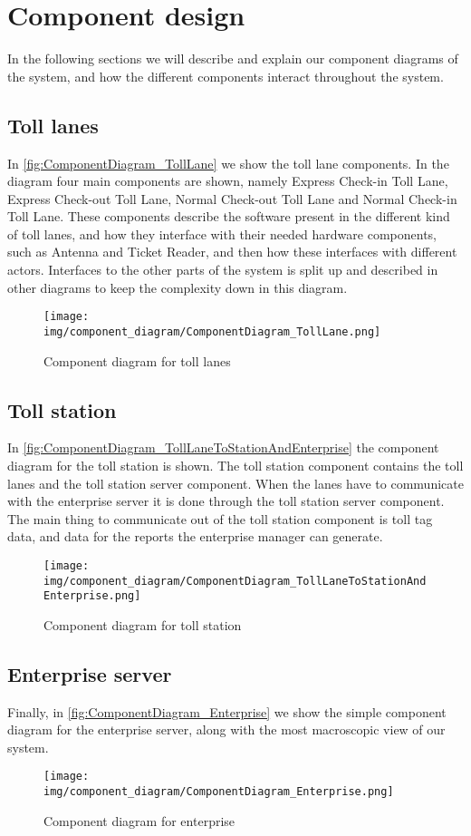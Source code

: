 \section*{Component design}
In the following sections we will describe and explain our component diagrams of the system, and how the different components interact throughout the system.
\subsection*{Toll lanes}
In \autoref{fig:ComponentDiagram_TollLane} we show the toll lane components. In the diagram four main components are shown, namely Express Check-in Toll Lane, Express Check-out Toll Lane, Normal Check-out Toll Lane and Normal Check-in Toll Lane. These components describe the software present in the different kind of toll lanes, and how they interface with their needed hardware components, such as Antenna and Ticket Reader, and then how these interfaces with different actors. Interfaces to the other parts of the system is split up and described in other diagrams to keep the complexity down in this diagram.
\begin{figure}[H]
\centering
\texttt{[image: img/component\_diagram/ComponentDiagram\_TollLane.png]}
\caption{Component diagram for toll lanes}
\label{fig:ComponentDiagram_TollLane}
\end{figure}

\subsection*{Toll station}
In \autoref{fig:ComponentDiagram_TollLaneToStationAndEnterprise} the component diagram for the toll station is shown. The toll station component contains the toll lanes and the toll station server component. When the lanes have to communicate with the enterprise server it is done through the toll station server component. The main thing to communicate out of the toll station component is toll tag data, and data for the reports the enterprise manager can generate.
\begin{figure}[H]
\centering
\texttt{[image: img/component\_diagram/ComponentDiagram\_TollLaneToStationAndEnterprise.png]}
\caption{Component diagram for toll station}
\label{fig:ComponentDiagram_TollLaneToStationAndEnterprise}
\end{figure}

\subsection*{Enterprise server}
Finally, in \autoref{fig:ComponentDiagram_Enterprise} we show the simple component diagram for the enterprise server, along with the most macroscopic view of our system. 
\begin{figure}[H]
\centering
\texttt{[image: img/component\_diagram/ComponentDiagram\_Enterprise.png]}
\caption{Component diagram for enterprise}
\label{fig:ComponentDiagram_Enterprise}
\end{figure}
